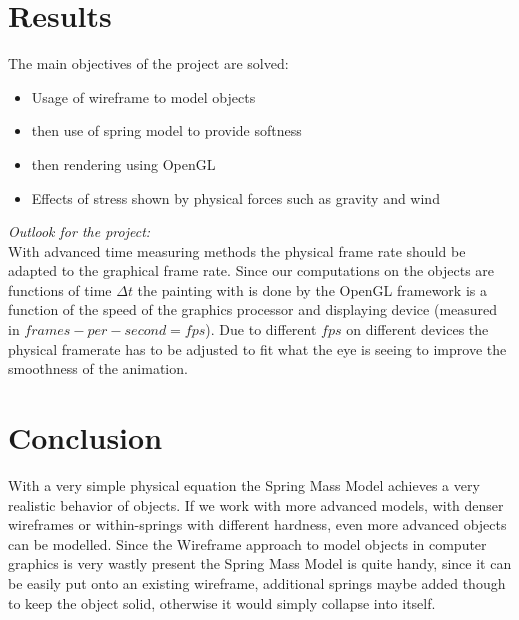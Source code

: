 \documentclass[11pt]{article}
\begin{document}
\section{Results}
The main objectives of the project are solved:
\begin{itemize}
\item{Usage of wireframe to model objects}
\item{then use of spring model to provide softness}
\item{then rendering using OpenGL}
\item{Effects of stress shown by physical forces such as gravity and wind}
\end{itemize}

\textit{Outlook for the project:}\\
With advanced time measuring methods the physical frame rate should be adapted to the graphical frame rate. Since our computations on the objects are functions of time $\Delta t$ the painting with is done by the OpenGL framework is a function of the speed of the graphics processor and displaying device (measured in $frames-per-second=fps$). Due to different $fps$ on different devices the physical framerate has to be adjusted to fit what the eye is seeing to improve the smoothness of the animation.\\[1em]
%

\section{Conclusion}
With a very simple physical equation the Spring Mass Model achieves a very realistic behavior of objects. If we work with more advanced models, with denser wireframes or within-springs with different hardness, even more advanced objects can be modelled. Since the Wireframe approach to model objects in computer graphics is very wastly present the Spring Mass Model is quite handy, since it can be easily put onto an existing wireframe, additional springs maybe added though to keep the object solid, otherwise it would simply collapse into itself.
%


%
%
\newpage
\nocite{hill}
\nocite{rogersadams}
\nocite{dam}
\nocite{PBDM}
\nocite{baker}
\nocite{bakerGL}
\nocite{IASDO}
\nocite{LSCS}
\nocite{DCMSM}
\nocite{gama}
\nocite{wiki}
\nocite{hair}
\nocite{pyGL}



%
%
\end{document}
